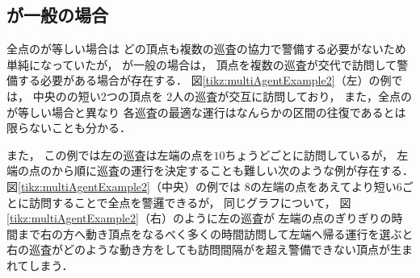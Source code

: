 
\subsection{{\idletime}が一般の場合}
\label{subsec:LineDifferentTimelimit}

全点の{\idletime}が等しい場合は
どの頂点も複数の巡査の協力で警備する必要がないため単純になっていたが，
{\idletime}が一般の場合は，
頂点を複数の巡査が交代で訪問して警備する必要がある場合が存在する．
%
図\ref{tikz:multiAgentExample2}（左）の例では，
中央の{\idletime}の短い2つの頂点を
2人の巡査が交互に訪問しており，
また，全点の{\idletime}が等しい場合と異なり
各巡査の最適な運行はなんらかの区間の往復であるとは限らないことも分かる．


また，
この例では左の巡査は左端の点を{\idletime}$10$ちょうどごとに訪問しているが，
左端の点の{\idletime}から順に巡査の運行を決定することも難しい次のような例が存在する．
図\ref{tikz:multiAgentExample2}（中央）の例では
{\idletime}$8$の左端の点をあえてより短い$6$ごとに訪問することで全点を警邏できるが，
同じグラフについて，
図\ref{tikz:multiAgentExample2}（右）のように左の巡査が
左端の点の{\idletime}ぎりぎりの時間まで右の方へ動き頂点をなるべく多くの時間訪問して左端へ帰る運行を選ぶと
右の巡査がどのような動き方をしても訪問間隔が{\idletime}を超え警備できない頂点が生まれてしまう．



